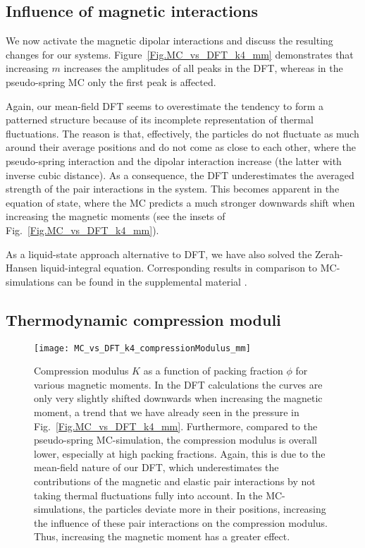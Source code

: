 \documentclass[aps,pre,twocolumn,superscriptaddress,nofootinbib]{revtex4}
\begin{document}
\subsection{Influence of magnetic interactions}

We now activate the magnetic dipolar interactions and discuss the resulting changes for our systems. 
Figure~\ref{Fig.MC_vs_DFT_k4_mm} demonstrates that increasing $m$ increases the amplitudes of all peaks in the DFT, whereas in the pseudo-spring MC only the first peak is affected.

Again, our mean-field DFT seems to overestimate the tendency to form a patterned structure because of its incomplete representation of thermal fluctuations. 
The reason is that, effectively, the particles do not fluctuate as much around their average positions and do not come as close to each other, where the pseudo-spring interaction and the dipolar interaction increase (the latter with inverse cubic distance).
As a consequence, the DFT underestimates the averaged strength of the pair interactions in the system. 
This becomes apparent in the equation of state, where the MC predicts a much stronger downwards shift when increasing the magnetic moments (see the insets of Fig.~\ref{Fig.MC_vs_DFT_k4_mm}). 

As a liquid-state approach alternative to DFT, we have also solved the Zerah-Hansen liquid-integral equation. 
Corresponding results in comparison to MC-simulations can be found in the supplemental material \cite{supplemental}. 


\subsection{Thermodynamic compression moduli}
%
\begin{figure*}[t]
	\texttt{[image: MC\_vs\_DFT\_k4\_compressionModulus\_mm]}
	\caption{Compression modulus $K$ as a function of packing fraction $\phi$ for various magnetic moments. In the DFT calculations the curves are only very slightly shifted downwards when increasing the magnetic moment, a trend that we have already seen in the pressure in Fig.~\ref{Fig.MC_vs_DFT_k4_mm}. Furthermore, compared to the pseudo-spring MC-simulation, the compression modulus is overall lower, especially at high packing fractions. Again, this is due to the mean-field nature of our DFT, which underestimates the contributions of the magnetic and elastic pair interactions by not taking thermal fluctuations fully into account. In the MC-simulations, the particles deviate more in their positions, increasing the influence of these pair interactions on the compression modulus. Thus, increasing the magnetic moment has a greater effect.}
	\label{Fig.MC_vs_DFT_k4_compressionModulus_mm}
\end{figure*}
%
\end{document}
